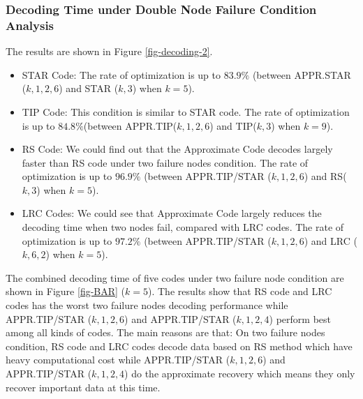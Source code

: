 \documentclass[sigconf]{acmart}
\begin{document}
\subsubsection{Decoding Time under Double Node Failure Condition Analysis}
The results are shown in Figure \ref{fig-decoding-2}.
\begin{itemize}
    \item STAR Code: The rate of optimization is up to $83.9\%$ (between APPR.STAR ($k,1,2,6$) and STAR ($k,3$) when $k = 5$).
    \item TIP Code: This condition is similar to STAR code. The rate of optimization is up to $84.8\% $(between APPR.TIP($k,1,2,6$) and TIP($k,3$) when $k = 9$).
    \item RS Code: We could find out that the Approximate Code decodes largely faster than RS code under two failure nodes condition. The rate of optimization is up to $96.9\%$ (between APPR.TIP/STAR ($k,1,2,6$) and RS($k,3$) when $k = 5$).
    \item LRC Codes:
    We could see that Approximate Code largely reduces the decoding time when two nodes fail, compared with LRC codes. The rate of optimization is up to $97.2\%$ (between APPR.TIP/STAR ($k,1,2,6$) and LRC ($k, 6, 2$) when $k = 5$).
\end{itemize}

The combined decoding time of five codes under two failure node condition are shown in Figure \ref{fig-BAR} ($k=5$). The results show that RS code and LRC codes has the worst two failure nodes decoding performance while APPR.TIP/STAR ($k,1,2,6$) and APPR.TIP/STAR ($k,1,2,4$) perform best among all kinds of codes. The main reasons are that: On two failure nodes condition, RS code and LRC codes decode data based on RS method which have heavy computational cost while APPR.TIP/STAR ($k,1,2,6$) and APPR.TIP/STAR ($k,1,2,4$) do the approximate recovery which means they only recover important data at this time.
\end{document}
